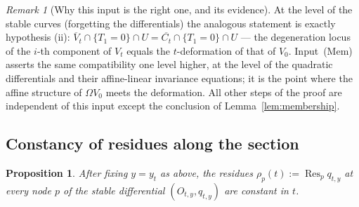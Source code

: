 \documentclass[11pt]{article}
\DeclareMathOperator{\Res}{Res}
\newtheorem{prop}[thm]{Proposition}
\theoremstyle{definition}
\theoremstyle{remark}
\newtheorem{rmk}[thm]{Remark}
\begin{document}

\begin{rmk}[Why this input is the right one, and its evidence]
At the level of the stable curves (forgetting the differentials) the
analogous statement is exactly hypothesis (ii):
$\overline V_t \cap \{T_1 = 0\}\cap U = \overline{C_t} \cap\{T_1=0\}
\cap U$ --- the degeneration locus of the $i$-th component of $V_t$
equals the $t$-deformation of that of $V_0$. Input~(Mem) asserts the
same compatibility one level higher, at the level of the quadratic
differentials and their affine-linear invariance equations; it is the
point where the affine structure of $\Omega V_0$ meets the deformation.
All other steps of the proof are independent of this input except the
conclusion of Lemma~\ref{lem:membership}.
\end{rmk}
\subsection{Constancy of residues along the section}

\begin{prop}\label{prop:constresidue}
After fixing $y = y_t$ as above, the residues
$\rho_p(t) := \Res_p q_{t,y}$ at every node $p$ of the stable
differential $(O_{t,y}, q_{t,y})$ are constant in $t$.
\end{prop}
\end{document}
